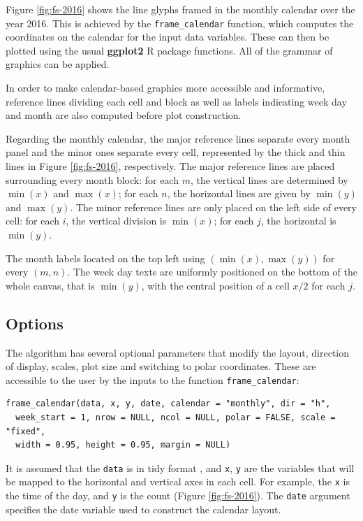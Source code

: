 \documentclass[12pt]{article}
\begin{document}
Figure \ref{fig:fs-2016} shows the line glyphs framed in the monthly calendar over the year 2016. This is achieved by the \texttt{frame\_calendar} function, which computes the coordinates on the calendar for the input data variables. These can then be plotted using the usual \textbf{ggplot2} R package \citep{R-ggplot2} functions. All of the grammar of graphics can be applied.

In order to make calendar-based graphics more accessible and informative, reference lines dividing each cell and block as well as labels indicating week day and month are also computed before plot construction.

Regarding the monthly calendar, the major reference lines separate every month panel and the minor ones separate every cell, represented by the thick and thin lines in Figure \ref{fig:fs-2016}, respectively. The major reference lines are placed surrounding every month block: for each \(m\), the vertical lines are determined by \(\min{(x)}\) and \(\max{(x)}\); for each \(n\), the horizontal lines are given by \(\min{(y)}\) and \(\max{(y)}\). The minor reference lines are only placed on the left side of every cell: for each \(i\), the vertical division is \(\min{(x)}\); for each \(j\), the horizontal is \(\min{(y)}\).

The month labels located on the top left using \((\min{(x)}, \max{(y)})\) for every \((m, n)\). The week day texts are uniformly positioned on the bottom of the whole canvas, that is \(\min{(y)}\), with the central position of a cell \(x / 2\) for each \(j\).

\hypertarget{sec:opt}{%
\subsection{Options}\label{sec:opt}}

The algorithm has several optional parameters that modify the layout, direction of display, scales, plot size and switching to polar coordinates. These are accessible to the user by the inputs to the function \texttt{frame\_calendar}:

\begin{verbatim}
frame_calendar(data, x, y, date, calendar = "monthly", dir = "h", 
  week_start = 1, nrow = NULL, ncol = NULL, polar = FALSE, scale = "fixed", 
  width = 0.95, height = 0.95, margin = NULL)
\end{verbatim}

It is assumed that the \texttt{data} is in tidy format \citep{wickham2014tidy}, and \texttt{x}, \texttt{y} are the variables that will be mapped to the horizontal and vertical axes in each cell. For example, the \texttt{x} is the time of the day, and \texttt{y} is the count (Figure \ref{fig:fs-2016}). The \texttt{date} argument specifies the date variable used to construct the calendar layout.
\end{document}
